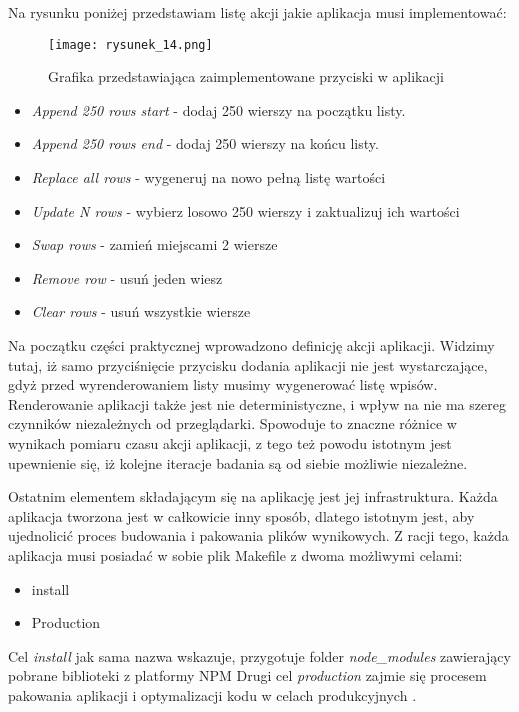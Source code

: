 Na rysunku poniżej przedstawiam listę akcji jakie aplikacja musi implementować:

\begin{figure}[htbp]
    \centering
    \texttt{[image: rysunek\_14.png]}
    \caption{Grafika przedstawiająca zaimplementowane przyciski w aplikacji}
    \label{fig:rysunek_14}
\end{figure}

\begin{itemize}
    \item \emph{Append 250 rows start} - dodaj 250 wierszy na początku listy.
    \item \emph{Append 250 rows end} - dodaj 250 wierszy na końcu listy.
    \item \emph{Replace all rows} - wygeneruj na nowo pełną listę wartości
    \item \emph{Update N rows} - wybierz losowo 250 wierszy i zaktualizuj ich wartości
    \item \emph{Swap rows} - zamień miejscami 2 wiersze
    \item \emph{Remove row} - usuń jeden wiesz
    \item \emph{Clear rows} - usuń wszystkie wiersze
\end{itemize}

Na początku części praktycznej wprowadzono definicję akcji aplikacji. Widzimy tutaj, iż samo przyciśnięcie przycisku dodania aplikacji nie jest wystarczające, gdyż przed wyrenderowaniem listy musimy wygenerować listę wpisów.
Renderowanie aplikacji także jest nie deterministyczne, i wpływ na nie ma szereg czynników niezależnych od przeglądarki.
Spowoduje to znaczne różnice w wynikach pomiaru czasu akcji aplikacji, z tego też powodu istotnym jest upewnienie się, iż kolejne iteracje badania są od siebie możliwie niezależne.

Ostatnim elementem składającym się na aplikację jest jej infrastruktura. Każda aplikacja tworzona jest w całkowicie inny sposób, dlatego istotnym jest, aby ujednolicić proces budowania i pakowania plików wynikowych.
Z racji tego, każda aplikacja musi posiadać w sobie plik Makefile \cite{gnu-makefile} z dwoma możliwymi celami:

\begin{itemize}
    \item install
    \item Production
\end{itemize}

Cel \emph{install} jak sama nazwa wskazuje, przygotuje folder \emph{node\_modules} zawierający pobrane biblioteki z platformy NPM \cite{npm}
Drugi cel \emph{production} zajmie się procesem pakowania aplikacji i optymalizacji kodu w celach produkcyjnych \cite{react-perf}.

